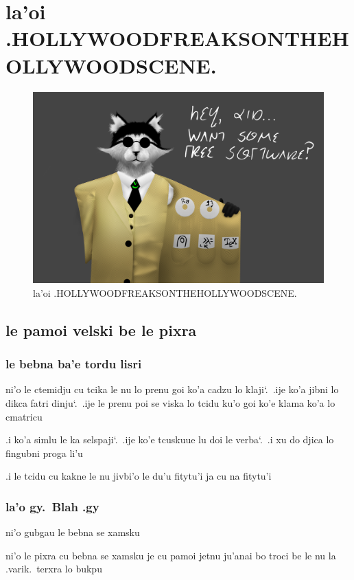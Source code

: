 \documentclass{report}
\newcommand\sds{\spacefactor\sfcode`.\ \space}
\begin{document}
\chapter{la'oi .HOLLYWOODFREAKSONTHEHOLLYWOODSCENE.}
\begin{figure}[ht]
	\centering
	\includegraphics[keepaspectratio, width=\textwidth, height=0.75\textheight]{hollywoodfreaksonthehollywoodscene/hollywoodfreaksonthehollywoodscene.png}
	\caption[center]{la'oi .HOLLYWOODFREAKSONTHEHOLLYWOODSCENE.}
\end{figure}
\section{le pamoi velski be le pixra}
\subsection{le bebna ba'e tordu lisri}
ni'o le ctemidju cu tcika le nu lo prenu goi ko'a cadzu lo klaji\sds  .ije ko'a jibni lo dikca fatri dinju\sds  .ije le prenu poi se viska lo tcidu ku'o goi ko'e klama ko'a lo cmatricu

.i ko'a simlu le ka selspaji\sds  .ije ko'e tcuskuue lu doi le verba\sds  .i xu do djica lo fingubni proga li'u

.i le tcidu cu kakne le nu jivbi'o le du'u fitytu'i ja cu na fitytu'i

\subsection{la'o gy.\ Blah .gy}
ni'o gubgau le bebna se xamsku

ni'o le pixra cu bebna se xamsku je cu pamoi jetnu ju'anai bo troci be le nu la .varik.\ terxra lo bukpu
\end{document}
